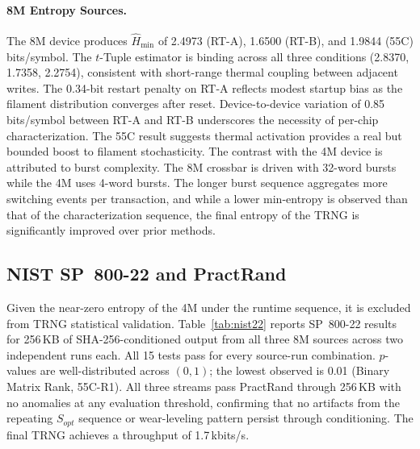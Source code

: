 

\paragraph{8M Entropy Sources.}
The 8M device produces $\hat{H}_{\min}$ of 2.4973 (RT-A), 1.6500 (RT-B),
and 1.9844 (55\textdegree{}C) bits/symbol. The $t$-Tuple estimator is
binding across all three conditions (2.8370, 1.7358, 2.2754), consistent
with short-range thermal coupling between adjacent writes. The 0.34-bit
restart penalty on RT-A reflects modest startup bias as the filament
distribution converges after reset. Device-to-device variation of 0.85
bits/symbol between RT-A and RT-B underscores the necessity of per-chip
characterization. The 55\textdegree{}C result suggests thermal
activation provides a real but bounded boost to filament stochasticity.
The contrast with the 4M device is attributed to burst complexity. The
8M crossbar is driven with 32-word bursts while the 4M uses 4-word
bursts. The longer burst sequence aggregates more switching events per
transaction, and while a lower min-entropy is observed than that of the
characterization sequence, the final entropy of the TRNG is
significantly improved over prior methods.



\subsection{NIST SP~800-22 and PractRand}
Given the near-zero entropy of the 4M under the runtime sequence, it is
excluded from TRNG statistical validation. Table~\ref{tab:nist22}
reports SP~800-22 results for 256\,KB of SHA-256-conditioned output from
all three 8M sources across two independent runs each. All 15 tests pass
for every source-run combination. $p$-values are well-distributed across
$(0,1)$; the lowest observed is 0.01 (Binary Matrix Rank,
55\textdegree{}C-R1). All three streams pass PractRand through 256\,KB
with no anomalies at any evaluation threshold, confirming that no
artifacts from the repeating $S_{opt}$ sequence or wear-leveling pattern
persist through conditioning. The final TRNG achieves a throughput of
1.7\,kbits/s.

